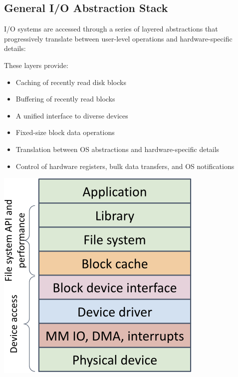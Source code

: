 \documentclass[../../compsys.tex]{subfiles}
\begin{document}
\subsection{General I/O Abstraction Stack}
I/O systems are accessed through a series of layered abstractions that progressively translate between user-level operations and hardware-specific details:

\begin{minipage}{0.45\textwidth}
        These layers provide:
        \begin{itemize}
            \item Caching of recently read disk blocks
            \item Buffering of recently read blocks
            \item A unified interface to diverse devices
            \item Fixed-size block data operations
            \item Translation between OS abstractions and hardware-specific details
            \item Control of hardware registers, bulk data transfers, and OS notifications
        \end{itemize}

\end{minipage}
\hfill
\vline
\hfill
\begin{minipage}{0.45\textwidth}
    \begin{center}
        \includegraphics[width=0.75\textwidth]{chapters/L8/images/io-stack.png}
    \end{center}
\end{minipage}
\end{document}

